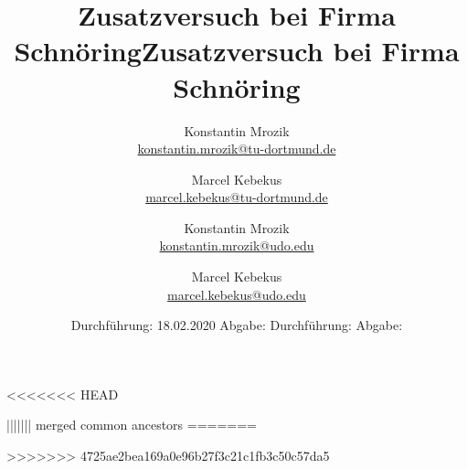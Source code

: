 <<<<<<< HEAD


\title{Zusatzversuch bei Firma Schnöring}
\author{%
  Konstantin Mrozik\\%
  \href{mailto:konstantin.mrozik@tu-dortmund.de}{konstantin.mrozik@tu-dortmund.de}%
  \and%
  Marcel Kebekus\\%
  \href{mailto:marcel.kebekus@tu-dortmund.de}{marcel.kebekus@tu-dortmund.de}%
}
\date{%
  Durchführung: 18.02.2020
  \hspace{3em}
  Abgabe: 
}
\publishers{TU Dortmund – Fakultät Physik}
\makeatletter         
\def\@maketitle{
\raggedright
\texttt{[image: bilder/lo\_TU-Do 2008/logo\_rgb\_jpg]}\\[8ex]
\begin{center}
{\Huge \bfseries \sffamily \@title }\\[4ex] 
{\Large  \@author}\\[4ex] 
\@date\\[8ex]
\publishers\\
\end{center}}
\makeatother





\maketitle
\thispagestyle{empty}
\tableofcontents
\newpage





\newpage
\printbibliography


||||||| merged common ancestors
=======


\title{Zusatzversuch bei Firma Schnöring}
\author{%
  Konstantin Mrozik\\%
  \href{mailto:konstantin.mrozik@udo.edu}{konstantin.mrozik@udo.edu}%
  \and%
  Marcel Kebekus\\%
  \href{mailto:marcel.kebekus@udo.edu}{marcel.kebekus@udo.edu}%
}
\date{%
  Durchführung: 
  \hspace{3em}
  Abgabe: 
}
\publishers{TU Dortmund – Fakultät Physik}
\makeatletter         
\def\@maketitle{
\raggedright
\texttt{[image: bilder/lo\_TU-Do 2008/logo\_rgb\_jpg]}\\[8ex]
\begin{center}
{\Huge \bfseries \sffamily \@title }\\[4ex] 
{\Large  \@author}\\[4ex] 
\@date\\[8ex]
\publishers\\
\end{center}}
\makeatother





\maketitle
\thispagestyle{empty}
\tableofcontents
\newpage


%
%
\nocite{*}
\printbibliography


>>>>>>> 4725ae2bea169a0e96b27f3c21c1fb3c50c57da5

